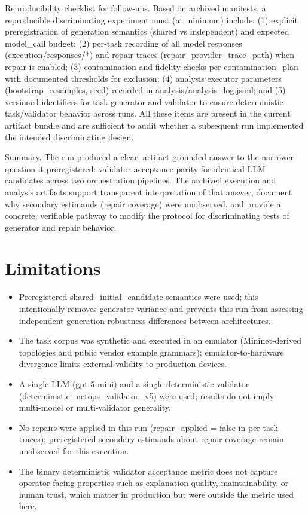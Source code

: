 \documentclass[conference]{IEEEtran}
\begin{document}
Reproducibility checklist for follow‑ups. Based on archived manifests, a reproducible discriminating experiment must (at minimum) include: (1) explicit preregistration of generation semantics (shared vs independent) and expected model\_call budget; (2) per‑task recording of all model responses (execution/responses/*) and repair traces (repair\_provider\_trace\_path) when repair is enabled; (3) contamination and fidelity checks per contamination\_plan with documented thresholds for exclusion; (4) analysis executor parameters (bootstrap\_resamples, seed) recorded in analysis/analysis\_log.jsonl; and (5) versioned identifiers for task generator and validator to ensure deterministic task/validator behavior across runs. All these items are present in the current artifact bundle and are sufficient to audit whether a subsequent run implemented the intended discriminating design.

Summary. The run produced a clear, artifact‑grounded answer to the narrower question it preregistered: validator‑acceptance parity for identical LLM candidates across two orchestration pipelines. The archived execution and analysis artifacts support transparent interpretation of that answer, document why secondary estimands (repair coverage) were unobserved, and provide a concrete, verifiable pathway to modify the protocol for discriminating tests of generator and repair behavior.

\section{Limitations}
\begin{itemize}
\item Preregistered shared\_initial\_candidate semantics were used; this intentionally removes generator variance and prevents this run from assessing independent generation robustness differences between architectures.
\item The task corpus was synthetic and executed in an emulator (Mininet‑derived topologies and public vendor example grammars); emulator‑to‑hardware divergence limits external validity to production devices.
\item A single LLM (gpt‑5‑mini) and a single deterministic validator (deterministic\_netops\_validator\_v5) were used; results do not imply multi‑model or multi‑validator generality.
\item No repairs were applied in this run (repair\_applied = false in per‑task traces); preregistered secondary estimands about repair coverage remain unobserved for this execution.
\item The binary deterministic validator acceptance metric does not capture operator‑facing properties such as explanation quality, maintainability, or human trust, which matter in production but were outside the metric used here.
\end{itemize}
\end{document}
